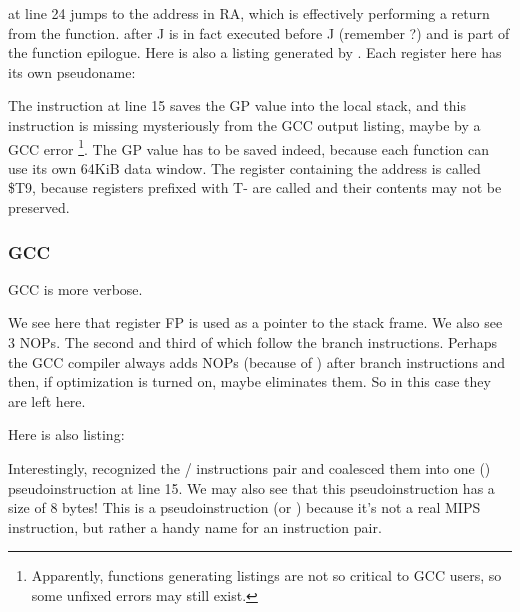 
 at line 24 jumps to the address in \ac{RA}, which is effectively performing a return from the function.
 after J is in fact executed before J (remember ?) and is part of the function epilogue.
Here is also a listing generated by \IDA. Each register here has its own pseudoname:



The instruction at line 15 saves the GP value into the local stack, and this instruction is missing mysteriously from the GCC output listing, maybe by a GCC error
\footnote{Apparently, functions generating listings are not so critical to GCC users, so some unfixed errors may still exist.}.
The GP value has to be saved indeed, because each function can use its own 64KiB data window.
The register containing the \puts address is called \$T9, because registers prefixed with T- are called
 and their contents may not be preserved.

\subsubsection{\NonOptimizing GCC}

\NonOptimizing GCC is more verbose.



We see here that register FP is used as a pointer to the stack frame.
We also see 3 \ac{NOP}s.
The second and third of which follow the branch instructions.
Perhaps the GCC compiler always adds \ac{NOP}s (because of ) after branch
instructions and then, if optimization is turned on, maybe eliminates them.
So in this case they are left here.

Here is also \IDA listing:




Interestingly, \IDA recognized the / instructions pair and coalesced them into one 
 () pseudoinstruction at line 15.
We may also see that this pseudoinstruction has a size of 8 bytes!
This is a pseudoinstruction (or ) because it's not a real MIPS instruction, but rather
a handy name for an instruction pair.

